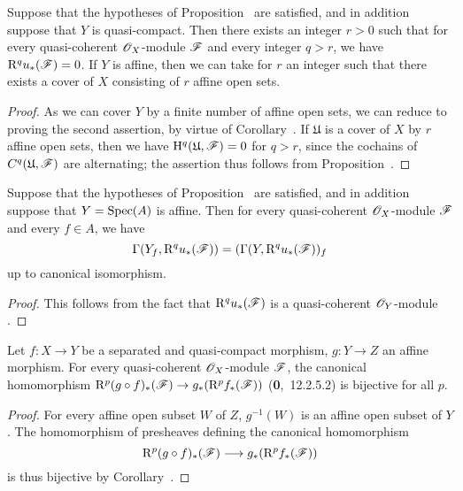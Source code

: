 \begin{corollary}[1.4.12]
\label{III.1.4.12}
Suppose that the hypotheses of Proposition~ are satisfied, and in addition suppose that $Y$ is quasi-compact.
Then there exists an integer $r>0$ such that for every quasi-coherent $\mathscr{O}_X$-module $\mathscr{F}$ and every integer $q>r$, we have $\mathrm{R}^q u_*(\mathscr{F})=0$.
If $Y$ is affine, then we can take for $r$ an integer such that there exists a cover of $X$ consisting of $r$ affine open sets.
\end{corollary}

\begin{proof}
As we can cover $Y$ by a finite number of affine open sets, we can reduce to proving the second assertion, by virtue of Corollary~.
If $\mathfrak{U}$ is a cover of $X$ by $r$ affine open sets, then we have $\mathrm{H}^q(\mathfrak{U},\mathscr{F})=0$ for $q>r$, since the cochains of $C^q(\mathfrak{U},\mathscr{F})$ are alternating; the assertion thus follows from Proposition~.
\end{proof}

\begin{corollary}[1.4.13]
\label{III.1.4.13}
Suppose that the hypotheses of Proposition~ are satisfied, and in addition suppose that $Y=\operatorname{Spec}(A)$ is affine.
Then for every quasi-coherent $\mathscr{O}_X$-module $\mathscr{F}$ and every $f\in A$, we have
\[
  \Gamma(Y_f,\mathrm{R}^q u_*(\mathscr{F}))=(\Gamma(Y,\mathrm{R}^q u_*(\mathscr{F}))_f
\]
up to canonical isomorphism.
\end{corollary}

\begin{proof}
This follows from the fact that $\mathrm{R}^q u_*(\mathscr{F})$ is a quasi-coherent $\mathscr{O}_Y$-module .
\end{proof}

\begin{proposition}[1.4.14]
\label{III.1.4.14}
Let $f:X\to Y$ be a separated and quasi-compact morphism, $g:Y\to Z$ an affine morphism.
For every quasi-coherent $\mathscr{O}_X$-module $\mathscr{F}$, the canonical homomorphism $\RR^p(g\circ f)_*(\sh{F})\to g_*(\RR^p f_*(\sh{F}))$ (\textbf{0},~12.2.5.2) is bijective for all $p$.
\end{proposition}

\begin{proof}
For every affine open subset $W$ of $Z$, $g^{-1}(W)$ is an affine open subset of $Y$.
The homomorphism of presheaves defining the canonical homomorphism
\[
  \RR^p(g\circ f)_*(\sh{F})\to g_*(\RR^p f_*(\sh{F}))
\]
 is thus bijective by Corollary~.
\end{proof}

